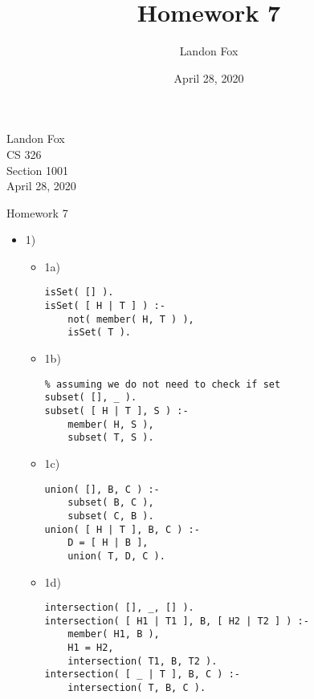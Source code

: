 \documentclass[ 12pt ]{article}
\begin{document}
\title{Homework 7}
\author{Landon Fox}
\date{April 28, 2020}

\begin{flushleft}
Landon Fox \\
CS 326 \\
Section 1001 \\
April 28, 2020
\end{flushleft}
\begin{center}
\Large Homework 7
\end{center}

\begin{itemize}
	\item[] {\large 1)}
	\begin{itemize}
		\item[] {\large 1a)}
		\begin{center}
		\begin{lstlisting}
isSet( [] ).
isSet( [ H | T ] ) :-
	not( member( H, T ) ),
	isSet( T ).
		\end{lstlisting}
		\end{center}

		\item[] {\large 1b)}
		\begin{center}
		\begin{lstlisting}
% assuming we do not need to check if set
subset( [], _ ).
subset( [ H | T ], S ) :-
	member( H, S ),
	subset( T, S ).
		\end{lstlisting}
		\end{center}

		\item[] {\large 1c)}
		\begin{center}
		\begin{lstlisting}
union( [], B, C ) :-
	subset( B, C ),
	subset( C, B ).
union( [ H | T ], B, C ) :-
	D = [ H | B ],
	union( T, D, C ).
		\end{lstlisting}
		\end{center}

		\item[] {\large 1d)}
		\begin{center}
		\begin{lstlisting}
intersection( [], _, [] ).
intersection( [ H1 | T1 ], B, [ H2 | T2 ] ) :-
	member( H1, B ),
	H1 = H2,
	intersection( T1, B, T2 ).
intersection( [ _ | T ], B, C ) :-
	intersection( T, B, C ).
		\end{lstlisting}
		\end{center}
	\end{itemize}
	\newpage


\end{itemize}
\end{document}
